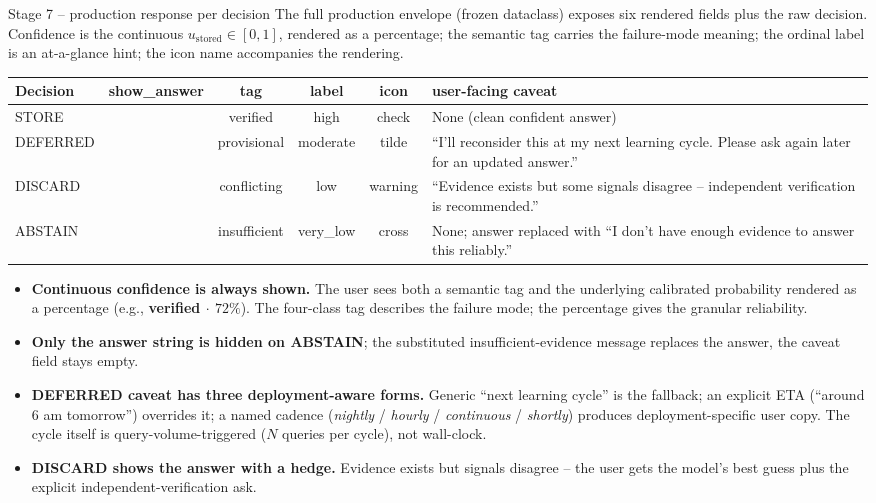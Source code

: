 \documentclass[10pt,aspectratio=169]{beamer}
\newcommand{\good}{{\color{caemgreen}\ding{51}}}
\newcommand{\bad}{{\color{caemred}\ding{55}}}
\begin{document}
\begin{frame}{Stage 7 -- production response per decision}
  \scriptsize
  The full production envelope (frozen dataclass) exposes six rendered fields plus the raw decision. Confidence is the continuous $u_{\text{stored}} \in [0, 1]$, rendered as a percentage; the semantic tag carries the failure-mode meaning; the ordinal label is an at-a-glance hint; the icon name accompanies the rendering.

  \vspace{0.3em}
  \begin{tabular}{@{}lccccp{4.6cm}@{}}
    \toprule
    Decision & \textbf{show\_answer} & tag & label & icon & user-facing caveat \\
    \midrule
    STORE    & \good & verified     & high      & check   & None (clean confident answer) \\
    DEFERRED & \good & provisional  & moderate  & tilde   & ``I'll reconsider this at my next learning cycle. Please ask again later for an updated answer.'' \\
    DISCARD  & \good & conflicting  & low       & warning & ``Evidence exists but some signals disagree -- independent verification is recommended.'' \\
    ABSTAIN  & \bad  & insufficient & very\_low & cross   & None; answer replaced with ``I don't have enough evidence to answer this reliably.'' \\
    \bottomrule
  \end{tabular}

  \vspace{0.4em}
  \begin{itemize}\scriptsize
    \item \textbf{Continuous confidence is always shown.} The user sees both a semantic tag and the underlying calibrated probability rendered as a percentage (e.g., \textbf{verified $\cdot$ $72\%$}). The four-class tag describes the failure mode; the percentage gives the granular reliability.
    \item \textbf{Only the answer string is hidden on ABSTAIN}; the substituted insufficient-evidence message replaces the answer, the caveat field stays empty.
    \item \textbf{DEFERRED caveat has three deployment-aware forms.} Generic ``next learning cycle'' is the fallback; an explicit ETA (``around 6 am tomorrow'') overrides it; a named cadence (\emph{nightly} / \emph{hourly} / \emph{continuous} / \emph{shortly}) produces deployment-specific user copy. The cycle itself is query-volume-triggered ($N$ queries per cycle), not wall-clock.
    \item \textbf{DISCARD shows the answer with a hedge.} Evidence exists but signals disagree -- the user gets the model's best guess plus the explicit independent-verification ask.
  \end{itemize}


\end{frame}
\end{document}
